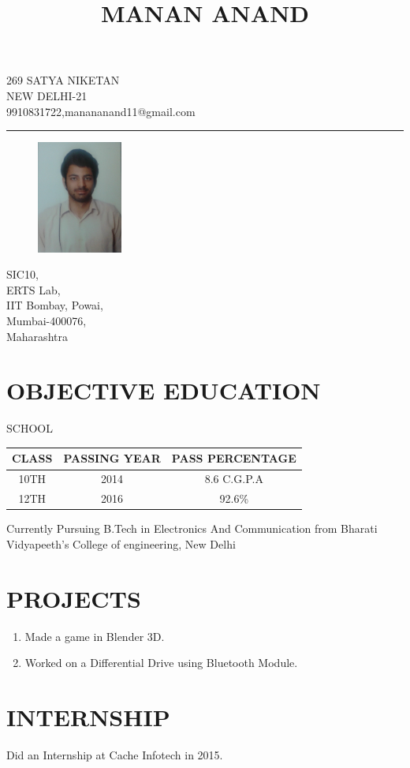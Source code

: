 \documentclass{article}
\date{}
\begin{document}
\title{MANAN ANAND}
\maketitle
\vspace{-2cm}

\begin{center}

{\large 269 SATYA NIKETAN\\
NEW DELHI-21\\
9910831722,manananand11@gmail.com\par} 
\end{center}
\noindent\rule{15cm}{1pt}


\begin{figure}
    \centering
    \includegraphics[width=0.25\textwidth]{manan_resume}
\end{figure}

SIC10,\\
ERTS Lab,\\
IIT Bombay, Powai,\\
Mumbai-400076,\\
Maharashtra

\section{OBJECTIVE EDUCATION}
\begin{center}
 SCHOOL
\end{center}

\begin{tabular}{ |c|c|c| } 
 \hline
 CLASS  & PASSING YEAR & PASS PERCENTAGE \\ 
\hline
 10TH & 2014 & 8.6 C.G.P.A \\ 
 12TH & 2016 & 92.6\% \\ 
 \hline
\end{tabular}

\large Currently Pursuing B.Tech in Electronics And Communication from Bharati Vidyapeeth's College of engineering, New Delhi

\section{PROJECTS}
\Large
\begin{enumerate}
\item Made a game in Blender 3D. 

\item Worked on a Differential Drive using Bluetooth Module.
\end{enumerate}

\section{INTERNSHIP}
Did an Internship at Cache Infotech in 2015.
\end{document}
